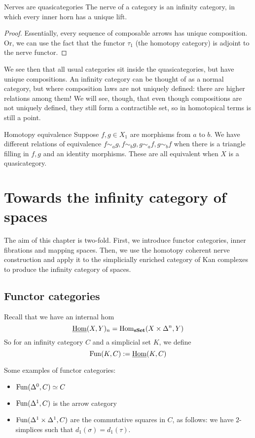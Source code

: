 \begin{proposition}{Nerves are quasicategories}{}
    The nerve of a category is an infinity category, in which every inner horn has a unique lift.
\end{proposition} 
\begin{proof}
    Essentially, every sequence of composable arrows has unique composition. Or, we can use the fact that the functor $\tau_1$ (the homotopy category) is adjoint to the nerve functor.
\end{proof}

We see then that all usual categories sit inside the quasicategories, but have unique compositions. An infinity category can be thought of as a normal category, but where composition laws are not uniquely defined: there are higher relations among them! We will see, though, that even though compositions are not uniquely defined, they still form a contractible set, so in homotopical terms is still a point.

\begin{definition}{Homotopy equivalence}{}
    Suppose $f,g\in X_1$ are morphisms from $a$ to $b$. We have different relations of equivalence $f\sim_a g, f\sim_b g, g\sim_a f, g\sim_b f$ when there is a triangle filling in $f,g$ and an identity morphisms. These are all equivalent when $X$ is a quasicategory.
\end{definition}

\section{Towards the infinity category of spaces}

The aim of this chapter is two-fold. First, we introduce functor categories, inner fibrations and mapping spaces. Then, we use the homotopy coherent nerve construction and apply it to the simplicially enriched category of Kan complexes to produce the infinity category of spaces.

\subsection{Functor categories}

Recall that we have an internal hom $$\underline{\operatorname{Hom}}(X,Y)_n=\operatorname{Hom}_{\operatorname{\mathbf{sSet}}}(X\times \Delta^n,Y)$$So for an infinity category $C$ and a simplicial set $K$, we define $$\mathrm{Fun}(K,C):=\underline{\operatorname{Hom}}(K,C)$$

Some examples of functor categories: \begin{itemize}
    \item $\mathrm{Fun}(\Delta^0,C)\simeq C$
    \item $\mathrm{Fun}(\Delta^1,C)$ is the arrow category
    \item $\mathrm{Fun}(\Delta^1\times \Delta^1, C)$ are the commutative squares in $C$, as follows: we have $2$-simplices such that $d_1(\sigma)=d_1(\tau)$. 
\end{itemize} 

